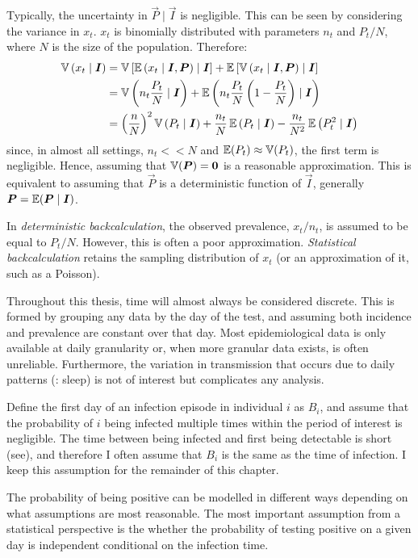 \documentclass[thesis.tex]{subfiles}
\begin{document}
Typically, the uncertainty in $\vec{P} \mid \vec{I}$ is negligible.
This can be seen by considering the variance in $x_t$.
$x_t$ is binomially distributed with parameters $n_t$ and $P_t / N$, where $N$ is the size of the population.
Therefore:
\begin{align}
  \operatorname{\mathbb{V}}\left( x_t \mid \bm{I} \right)
    &= \operatorname{\mathbb{V}}\left[\operatorname{\mathbb{E}}\left( x_t \mid \bm{I}, \bm{P} \right) \mid \bm{I} \right] + \operatorname{\mathbb{E}}\left[\operatorname{\mathbb{V}}\left( x_t \mid \bm{I}, \bm{P} \right) \mid \bm{I} \right] \\
    &= \operatorname{\mathbb{V}}\left( n_t \frac{P_t}{N} \mid \bm{I} \right) + \operatorname{\mathbb{E}}\left( n_t \frac{P_t}{N} \left(1 - \frac{P_t}{N} \right) \mid \bm{I} \right) \\
    &= \left( \frac{n}{N} \right)^2 \operatorname{\mathbb{V}}\left(P_t \mid \bm{I} \right) + \frac{n_t}{N} \operatorname{\mathbb{E}}\left(P_t \mid \bm{I} \right)  - \frac{n_t}{N^2} \operatorname{\mathbb{E}}\left(P_t^2 \mid \bm{I} \right)
\end{align}
since, in almost all settings, $n_t << N$ and $\operatorname{\mathbb{E}}(P_t) \approx \operatorname{\mathbb{V}}(P_t)$, the first term is negligible.
Hence, assuming that $\operatorname{\mathbb{V}}(\bm{P}) = \bm{0}$ is a reasonable approximation.
This is equivalent to assuming that $\vec{P}$ is a deterministic function of $\vec{I}$, generally $\bm{P} = \operatorname{\mathbb{E}}( \bm{P} \mid \bm{I})$.

In \emph{deterministic backcalculation}, the observed prevalence, $x_t/n_t$, is assumed to be equal to $P_t/N$.
However, this is often a poor approximation.
\emph{Statistical backcalculation} retains the sampling distribution of $x_t$ (or an approximation of it, such as a Poisson).

Throughout this thesis, time will almost always be considered discrete.
This is formed by grouping any data by the day of the test, and assuming both incidence and prevalence are constant over that day.
Most epidemiological data is only available at daily granularity or, when more granular data exists, is often unreliable.
Furthermore, the variation in transmission that occurs due to daily patterns (\eg: sleep) is not of interest but complicates any analysis. 

Define the first day of an infection episode in individual $i$ as $B_i$, and assume that the probability of $i$ being infected multiple times within the period of interest is negligible.
The time between being infected and first being detectable is short (see), and therefore I often assume that $B_i$ is the same as the time of infection.
I keep this assumption for the remainder of this chapter.

The probability of being positive can be modelled in different ways depending on what assumptions are most reasonable.
The most important assumption from a statistical perspective is the whether the probability of testing positive on a given day is independent conditional on the infection time.
\end{document}
